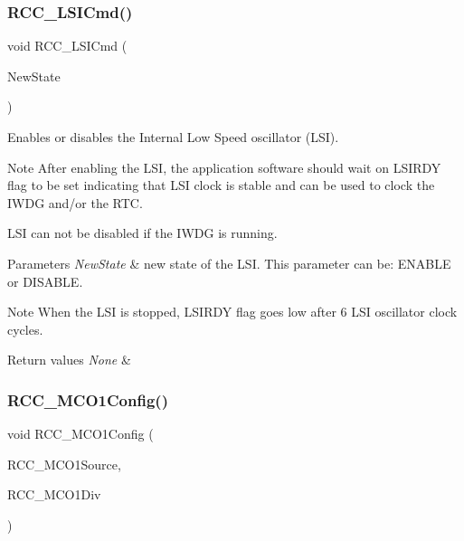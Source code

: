 \subsubsection{\texorpdfstring{R\+C\+C\+\_\+\+L\+S\+I\+Cmd()}{RCC\_LSICmd()}}
{\footnotesize\ttfamily void R\+C\+C\+\_\+\+L\+S\+I\+Cmd (\begin{DoxyParamCaption}\item[{Functional\+State}]{New\+State }\end{DoxyParamCaption})}



Enables or disables the Internal Low Speed oscillator (L\+SI). 

\begin{DoxyNote}{Note}
After enabling the L\+SI, the application software should wait on L\+S\+I\+R\+DY flag to be set indicating that L\+SI clock is stable and can be used to clock the I\+W\+DG and/or the R\+TC. 

L\+SI can not be disabled if the I\+W\+DG is running. ~\newline

\end{DoxyNote}

\begin{DoxyParams}{Parameters}
{\em New\+State} & new state of the L\+SI. This parameter can be\+: E\+N\+A\+B\+LE or D\+I\+S\+A\+B\+LE. \\
\hline
\end{DoxyParams}
\begin{DoxyNote}{Note}
When the L\+SI is stopped, L\+S\+I\+R\+DY flag goes low after 6 L\+SI oscillator clock cycles. 
\end{DoxyNote}

\begin{DoxyRetVals}{Return values}
{\em None} & \\
\hline
\end{DoxyRetVals}
\mbox{\label{group___r_c_c___group1_ga15c9ecb6ef015ed008cb28e5b7a50531}} 
\subsubsection{\texorpdfstring{R\+C\+C\+\_\+\+M\+C\+O1\+Config()}{RCC\_MCO1Config()}}
{\footnotesize\ttfamily void R\+C\+C\+\_\+\+M\+C\+O1\+Config (\begin{DoxyParamCaption}\item[{uint32\+\_\+t}]{R\+C\+C\+\_\+\+M\+C\+O1\+Source,  }\item[{uint32\+\_\+t}]{R\+C\+C\+\_\+\+M\+C\+O1\+Div }\end{DoxyParamCaption})}



